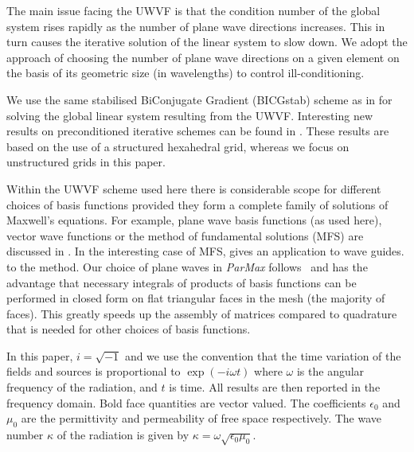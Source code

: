 \documentclass[a4paper,12pt]{article}
\begin{document}
The main issue facing the UWVF is that the condition number of the
global system rises rapidly as the number of plane wave directions
increases.  This in turn causes the iterative solution of the linear
system to slow down.  We adopt the approach of \cite{Huttunen2007}
choosing the number of plane wave directions on a given element on the
basis of its geometric size (in wavelengths) to control
ill-conditioning.

We use the same stabilised BiConjugate Gradient (BICGstab) scheme as
in \cite{Huttunen2007} for solving the global linear system resulting
from the UWVF.  Interesting new results on preconditioned iterative
schemes can be found in \cite{sirdey22}. These results are based on
the use of a structured hexahedral grid, whereas we focus on
unstructured grids in this paper.

Within the UWVF scheme used here there is considerable scope for
different choices of basis functions provided they form a complete
family of solutions of Maxwell's equations.  For example, plane wave
basis functions (as used here), vector wave functions or the method of
fundamental solutions (MFS) are discussed in \cite{badics14}.  In the
interesting case of MFS, \cite{hafner85} gives an application to wave
guides. to the method.  Our choice of plane waves in \emph{ParMax}
follows~\cite{cessenat_phd} and has the advantage that necessary
integrals of products of basis functions can be performed in closed
form on flat triangular faces in the mesh (the majority of
faces). This greatly speeds up the assembly of matrices compared to
quadrature that is needed for other choices of basis functions.

In this paper, $i=\sqrt{-1}$ and we use the convention that the time
variation of the fields and sources is proportional to $\exp(-i\omega
t)$ where $\omega$ is the angular frequency of the radiation, and $t$
is time.  All results are then reported in the frequency domain.  Bold
face quantities are vector valued. The coefficients $\epsilon_0$ and
$\mu_0$ are the permittivity and permeability of free space
respectively. The wave number $\kappa$ of the radiation is given by
$\kappa=\omega\sqrt{\epsilon_0\mu_0}$.
\end{document}
